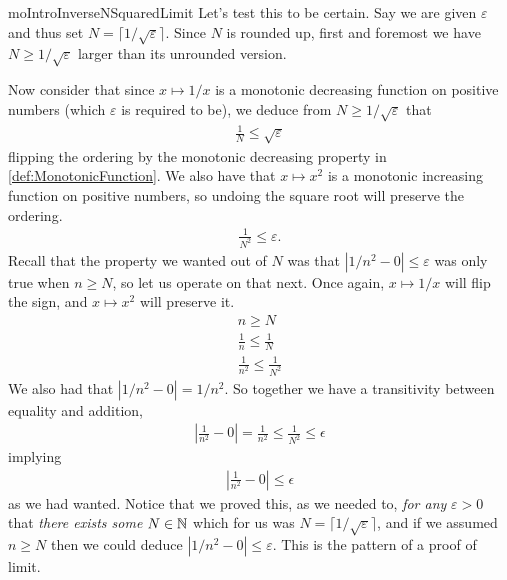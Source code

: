 \documentclass[11pt]{article}
\begin{document}
\begin{label example}{mo}{IntroInverseNSquaredLimit}
Let's test this to be certain. Say we are given $\varepsilon$ and thus set $N = \lceil 1/\sqrt{\varepsilon} \rceil$. Since $N$ is rounded up, first and foremost we have $N \ge 1/\sqrt{\varepsilon}$ larger than its unrounded version.

Now consider that since $x \mapsto 1/x$ is a monotonic decreasing function on positive numbers (which $\varepsilon$ is required to be), we deduce from $N \ge 1/\sqrt{\varepsilon}$ that \begin{gather*}
\frac{1}{N} \le \sqrt{\varepsilon}
\end{gather*}
flipping the ordering by the monotonic decreasing property in \ref{def:MonotonicFunction}. We also have that $x \mapsto x^2$ is a monotonic increasing function on positive numbers, so undoing the square root will preserve the ordering. \begin{gather*}
\frac{1}{N^2} \le \varepsilon.
\end{gather*}
Recall that the property we wanted out of $N$ was that $|1/n^2 - 0| \le \varepsilon$ was only true when $n \ge N$, so let us operate on that next. Once again, $x \mapsto 1/x$ will flip the sign, and $x \mapsto x^2$ will preserve it. \begin{gather*}
n \ge N \\
\frac{1}{n} \le \frac{1}{N} \\
\frac{1}{n^2} \le \frac{1}{N^2}
\end{gather*}
We also had that $|1/n^2 - 0| = 1/n^2$. So together we have a transitivity between equality and addition, \begin{gather*}
\left| \frac{1}{n^2} - 0\right| = \frac{1}{n^2} \le \frac{1}{N^2} \le \epsilon
\end{gather*}
implying \begin{gather*}
\left| \frac{1}{n^2} - 0\right| \le \epsilon
\end{gather*}
as we had wanted. Notice that we proved this, as we needed to, \emph{for any} $\varepsilon > 0$ that \emph{there exists some} $N \in \mathbb{N}$ which for us was $N = \lceil 1/\sqrt{\varepsilon} \rceil$, and if we assumed $n \ge N$ then we could deduce $|1/n^2 - 0| \le \varepsilon$. This is the pattern of a proof of limit.
\end{label example}
\end{document}
